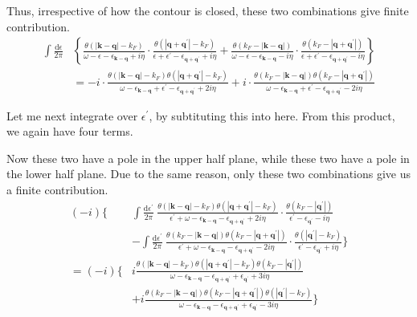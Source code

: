 Thus, irrespective of how the contour is closed, these two combinations give finite contribution.
\[\begin{split} \int \frac{\mathrm{d} \epsilon}{2\pi}
&\left \{ \frac{\theta(|\mathbf{k}-\mathbf{q}|-k_F)}{\omega - \epsilon - \epsilon_{\mathbf{k}-\mathbf{q}} + i \eta} \cdot \frac{ \theta(|\mathbf{q}+\mathbf{q}^{'}|-k_F)}{\epsilon + \epsilon^{'} - \epsilon_{\mathbf{q}+\mathbf{q}^{'}} + i \eta}
+ \frac{\theta(k_F-|\mathbf{k}-\mathbf{q}|)}{\omega - \epsilon - \epsilon_{\mathbf{k}-\mathbf{q}} - i \eta} \cdot \frac{ \theta(k_F-|\mathbf{q}+\mathbf{q}^{'}|)}{\epsilon + \epsilon^{'} - \epsilon_{\mathbf{q}+\mathbf{q}^{'}} - i \eta} \right \}\\
& = -i \cdot \frac{\theta(|\mathbf{k}-\mathbf{q}|-k_F)\theta(|\mathbf{q}+\mathbf{q}^{'}|-k_F)}{\omega - \epsilon_{\mathbf{k}-\mathbf{q}} + \epsilon^{'} - \epsilon_{\mathbf{q}+\mathbf{q}^{'}} + 2 i \eta }
+i \cdot \frac{\theta(k_F-|\mathbf{k}-\mathbf{q}|)\theta(k_F-|\mathbf{q}+\mathbf{q}^{'}|)}{\omega - \epsilon_{\mathbf{k}-\mathbf{q}} + \epsilon^{'} - \epsilon_{\mathbf{q}+\mathbf{q}^{'}} - 2 i \eta }
\end{split} \]

Let me next integrate over $\epsilon^{'}$, by subtituting this into here. From this product, we again have four terms.

Now these two have a pole in the upper half plane, while these two have a pole in the lower half plane. Due to the same reason, only these two combinations give us a finite contribution.
\[\begin{split}  (-i) \{
&\int \frac{\mathrm{d}\epsilon^{'}}{2\pi} \  \frac{\theta(|\mathbf{k}-\mathbf{q}|-k_F)\theta(|\mathbf{q}+\mathbf{q}^{'}|-k_F)}{\epsilon^{'} + \omega - \epsilon_{\mathbf{k}-\mathbf{q}} - \epsilon_{\mathbf{q}+\mathbf{q}^{'}} + 2 i \eta }
\cdot \frac{\theta(k_F-|\mathbf{q}^{'}|)}{\epsilon^{'}-\epsilon_{\mathbf{q}^{'}}-i \eta} \\
&- \int \frac{\mathrm{d}\epsilon^{'}}{2\pi} \ \frac{\theta(k_F-|\mathbf{k}-\mathbf{q}|)\theta(k_F-|\mathbf{q}+\mathbf{q}^{'}|)}{\epsilon^{'} + \omega - \epsilon_{\mathbf{k}-\mathbf{q}} - \epsilon_{\mathbf{q}+\mathbf{q}^{'}} - 2 i \eta }
\cdot \frac{\theta(|\mathbf{q}^{'}|-k_F)}{\epsilon^{'}-\epsilon_{\mathbf{q}^{'}}+i \eta} \} \\
=(-i) \{
&i \frac{\theta(|\mathbf{k}-\mathbf{q}|-k_F)\theta(|\mathbf{q}+\mathbf{q}^{'}|-k_F)\theta(k_F-|\mathbf{q}^{'}|)}{\omega - \epsilon_{\mathbf{k}-\mathbf{q}}-\epsilon_{\mathbf{q}+\mathbf{q}^{'}}+\epsilon_{\mathbf{q}^{'}}+3i \eta}\\
&+i \frac{\theta(k_F-|\mathbf{k}-\mathbf{q}|)\theta(k_F-|\mathbf{q}+\mathbf{q}^{'}|)\theta(|\mathbf{q}^{'}|-k_F)}{\omega - \epsilon_{\mathbf{k}-\mathbf{q}}-\epsilon_{\mathbf{q}+\mathbf{q}^{'}}+\epsilon_{\mathbf{q}^{'}}-3i \eta}
\}
 \end{split}\]

